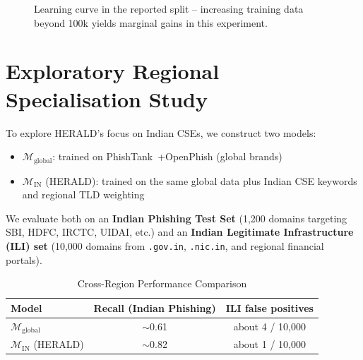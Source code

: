 \documentclass[conference]{IEEEtran}
\begin{document}
\begin{figure}[htbp]
\centering
{}
\caption{Learning curve in the reported split -- increasing training data beyond 100k yields marginal gains in this experiment.}
\label{fig:learning_curve}
\end{figure}

\section{Exploratory Regional Specialisation Study}
\label{sec:regional}

To explore HERALD's focus on Indian CSEs, we construct two models:
\begin{itemize}
    \item $\mathcal{M}_{\text{global}}$: trained on PhishTank~\cite{phishtank}+OpenPhish (global brands)
    \item $\mathcal{M}_{\text{IN}}$ (HERALD): trained on the same global data plus Indian CSE keywords and regional TLD weighting
\end{itemize}

We evaluate both on an \textbf{Indian Phishing Test Set} (1,200 domains targeting SBI, HDFC, IRCTC, UIDAI, etc.) and an \textbf{Indian Legitimate Infrastructure (ILI) set} (10,000 domains from \texttt{.gov.in}, \texttt{.nic.in}, and regional financial portals).

\begin{table}[htbp]
\centering
\small
\caption{Cross-Region Performance Comparison}
\begin{tabular}{lcc}
\toprule
\textbf{Model} & \textbf{Recall (Indian Phishing)} & \textbf{ILI false positives} \\
\midrule
$\mathcal{M}_{\text{global}}$ & $\sim$0.61 & about 4 / 10,000 \\
$\mathcal{M}_{\text{IN}}$ (HERALD) & $\sim$0.82 & about 1 / 10,000 \\
\bottomrule
\end{tabular}
\label{tab:regional_gain}
\end{table}
\end{document}
